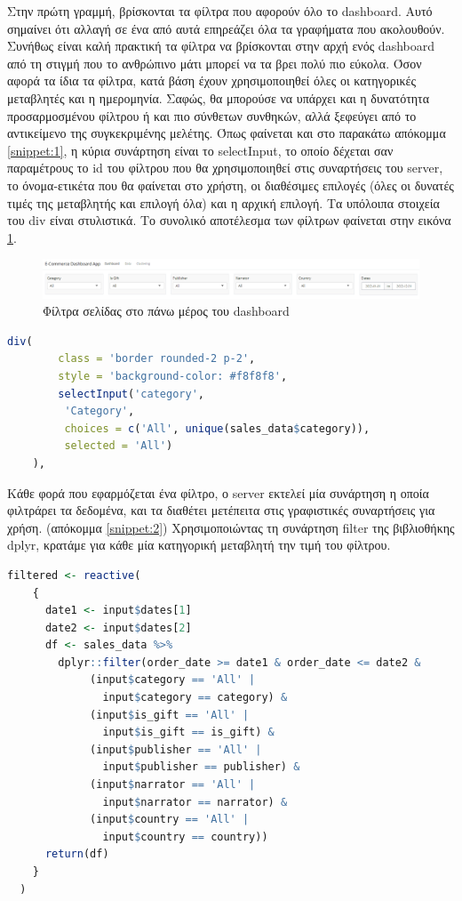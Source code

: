 \documentclass{article}
\begin{document}
Στην πρώτη γραμμή, βρίσκονται τα φίλτρα που αφορούν όλο το dashboard. Αυτό σημαίνει ότι αλλαγή σε ένα από αυτά επηρεάζει όλα τα γραφήματα που ακολουθούν. Συνήθως είναι καλή πρακτική τα φίλτρα να βρίσκονται στην αρχή ενός dashboard από τη στιγμή που το ανθρώπινο μάτι μπορεί να τα βρει πολύ πιο εύκολα. Όσον αφορά τα ίδια τα φίλτρα, κατά βάση έχουν χρησιμοποιηθεί όλες οι κατηγορικές μεταβλητές και η ημερομηνία. Σαφώς, θα μπορούσε να υπάρχει και η δυνατότητα προσαρμοσμένου φίλτρου ή και πιο σύνθετων συνθηκών, αλλά ξεφεύγει από το αντικείμενο της συγκεκριμένης μελέτης. Όπως φαίνεται και στο παρακάτω απόκομμα \ref{snippet:1}, η κύρια συνάρτηση είναι το selectInput, το οποίο δέχεται σαν παραμέτρους το id του φίλτρου που θα χρησιμοποιηθεί στις συναρτήσεις του server, το όνομα-ετικέτα που θα φαίνεται στο χρήστη, οι διαθέσιμες επιλογές (όλες οι δυνατές τιμές της μεταβλητής και επιλογή όλα) και η αρχική επιλογή. Τα υπόλοιπα στοιχεία του div είναι στυλιστικά. Το συνολικό αποτέλεσμα των φίλτρων φαίνεται στην εικόνα \ref{fig:7}.

\begin{figure}[h]
    \centering
    \includegraphics[width=\textwidth]{pictures/7_filters.png}
    \caption{Φίλτρα σελίδας στο πάνω μέρος του dashboard}
    \label{fig:7}
\end{figure}

\begin{lstlisting}[language=R, caption=Container φίλτρων, label={snippet:1}]  
    div(
        class = 'border rounded-2 p-2',
        style = 'background-color: #f8f8f8',
        selectInput('category', 
         'Category', 
         choices = c('All', unique(sales_data$category)), 
         selected = 'All')
    ),
\end{lstlisting}

Κάθε φορά που εφαρμόζεται ένα φίλτρο, ο server εκτελεί μία συνάρτηση η οποία φιλτράρει τα δεδομένα, και τα διαθέτει μετέπειτα στις γραφιστικές συναρτήσεις για χρήση. (απόκομμα \ref{snippet:2}) Χρησιμοποιώντας τη συνάρτηση filter της βιβλιοθήκης dplyr, κρατάμε για κάθε μία κατηγορική μεταβλητή την τιμή του φίλτρου.

\begin{lstlisting}[language=R, caption=Φιλτράρισμα δεδομένων, label={snippet:2}]
    filtered <- reactive(
    {
      date1 <- input$dates[1]
      date2 <- input$dates[2]
      df <- sales_data %>%
        dplyr::filter(order_date >= date1 & order_date <= date2 &
             (input$category == 'All' |
               input$category == category) &
             (input$is_gift == 'All' |
               input$is_gift == is_gift) &
             (input$publisher == 'All' |
               input$publisher == publisher) &
             (input$narrator == 'All' |
               input$narrator == narrator) &
             (input$country == 'All' |
               input$country == country))
      return(df)
    }
  )
\end{lstlisting}
\end{document}

